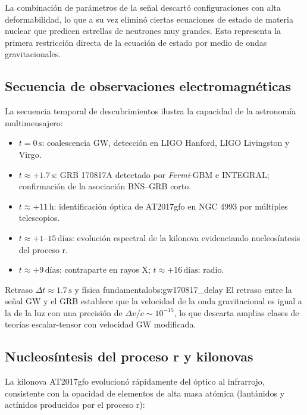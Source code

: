 \begin{importante}
La combinación de parámetros de la señal descartó configuraciones con alta deformabilidad, lo que a su vez eliminó ciertas ecuaciones de estado de materia nuclear que predicen estrellas de neutrones muy grandes. Esto representa la primera restricción directa de la ecuación de estado por medio de ondas gravitacionales.
\end{importante}

\subsection{Secuencia de observaciones electromagnéticas}

La secuencia temporal de descubrimientos ilustra la capacidad de la astronomía multimensajero:

\begin{itemize}[leftmargin=2em]
  \item $t=0\,\mathrm{s}$: coalescencia GW, detección en LIGO Hanford, LIGO Livingston y Virgo.
  \item $t\approx +1.7\,\mathrm{s}$: GRB 170817A detectado por \textit{Fermi}-GBM e INTEGRAL; confirmación de la asociación BNS--GRB corto.
  \item $t\approx +11\,\mathrm{h}$: identificación óptica de AT2017gfo en NGC 4993 por múltiples telescopios.
  \item $t\approx +1\text{--}15\,\mathrm{días}$: evolución espectral de la kilonova evidenciando nucleosíntesis del proceso r.
  \item $t\approx +9\,\mathrm{días}$: contraparte en rayos X; $t\approx +16\,\mathrm{días}$: radio.
\end{itemize}

\begin{observacion}{Retraso $\Delta t \approx 1.7\,\mathrm{s}$ y física fundamental}{obs:gw170817_delay}
El retraso entre la señal GW y el GRB establece que la velocidad de la onda gravitacional es igual a la de la luz con una precisión de $\Delta v/c \sim 10^{-15}$, lo que descarta amplias clases de teorías escalar-tensor con velocidad GW modificada.
\end{observacion}

\subsection{Nucleosíntesis del proceso r y kilonovas}

La kilonova AT2017gfo evolucionó rápidamente del óptico al infrarrojo, consistente con la opacidad de elementos de alta masa atómica (lantánidos y actínidos producidos por el proceso r):

